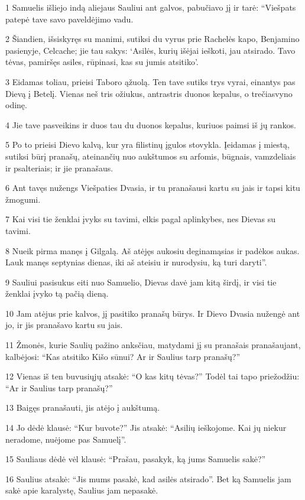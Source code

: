 \par 1 Samuelis išliejo indą aliejaus Sauliui ant galvos, pabučiavo jį ir tarė: “Viešpats patepė tave savo paveldėjimo vadu. 
\par 2 Šiandien, išsiskyręs su manimi, sutiksi du vyrus prie Rachelės kapo, Benjamino pasienyje, Celcache; jie tau sakys: ‘Asilės, kurių išėjai ieškoti, jau atsirado. Tavo tėvas, pamiršęs asiles, rūpinasi, kas su jumis atsitiko’. 
\par 3 Eidamas toliau, prieisi Taboro ąžuolą. Ten tave sutiks trys vyrai, einantys pas Dievą į Betelį. Vienas neš tris ožiukus, antras­tris duonos kepalus, o trečias­vyno odinę. 
\par 4 Jie tave pasveikins ir duos tau du duonos kepalus, kuriuos paimsi iš jų rankos. 
\par 5 Po to prieisi Dievo kalvą, kur yra filistinų įgulos stovykla. Įeidamas į miestą, sutiksi būrį pranašų, ateinančių nuo aukštumos su arfomis, būgnais, vamzdeliais ir psalteriais; ir jie pranašaus. 
\par 6 Ant tavęs nužengs Viešpaties Dvasia, ir tu pranašausi kartu su jais ir tapsi kitu žmogumi. 
\par 7 Kai visi tie ženklai įvyks su tavimi, elkis pagal aplinkybes, nes Dievas su tavimi. 
\par 8 Nueik pirma manęs į Gilgalą. Aš atėjęs aukosiu deginamąsias ir padėkos aukas. Lauk manęs septynias dienas, iki aš ateisiu ir nurodysiu, ką turi daryti”. 
\par 9 Sauliui pasisukus eiti nuo Samuelio, Dievas davė jam kitą širdį, ir visi tie ženklai įvyko tą pačią dieną. 
\par 10 Jam atėjus prie kalvos, jį pasitiko pranašų būrys. Ir Dievo Dvasia nužengė ant jo, ir jis pranašavo kartu su jais. 
\par 11 Žmonės, kurie Saulių pažino anksčiau, matydami jį su pranašais pranašaujant, kalbėjosi: “Kas atsitiko Kišo sūnui? Ar ir Saulius tarp pranašų?” 
\par 12 Vienas iš ten buvusiųjų atsakė: “O kas kitų tėvas?” Todėl tai tapo priežodžiu: “Ar ir Saulius tarp pranašų?” 
\par 13 Baigęs pranašauti, jis atėjo į aukštumą. 
\par 14 Jo dėdė klausė: “Kur buvote?” Jis atsakė: “Asilių ieškojome. Kai jų niekur neradome, nuėjome pas Samuelį”. 
\par 15 Sauliaus dėdė vėl klausė: “Prašau, pasakyk, ką jums Samuelis sakė?” 
\par 16 Saulius atsakė: “Jis mums pasakė, kad asilės atsirado”. Bet ką Samuelis jam sakė apie karalystę, Saulius jam nepasakė. 
